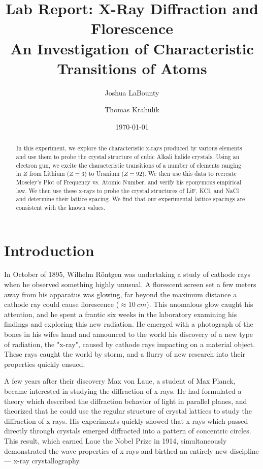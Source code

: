 \documentclass[%
 reprint,
 amsmath,amssymb,
 aps,
 pra,
]{revtex4-1}
\begin{document}

\title{\textbf{Lab Report: X-Ray Diffraction and Florescence} \\ \small{An Investigation of Characteristic Transitions of Atoms}}
\author{Joshua LaBounty}
\author{Thomas Krahulik}

\date{\today}

\begin{abstract}
In this experiment, we explore the characteristic x-rays produced by various elements and use them to probe the crystal structure of cubic Alkali halide crystals. Using an electron gun, we excite the characteristic transitions of a number of elements ranging in $Z$ from Lithium ($Z = 3$) to Uranium ($Z = 92$). We then use this data to recreate Moseley's Plot of Frequency vs. Atomic Number, and verify his eponymous empirical law. We then use these x-rays to probe the crystal structures of LiF, KCl, and NaCl and determine their lattice spacing. We find that our experimental lattice spacings are consistent with the known values.
\end{abstract}
\maketitle

\section{Introduction}

In October of 1895, Wilhelm R\"{o}ntgen was undertaking a study of cathode rays when he observed something highly unusual. A florescent screen set a few meters away from his apparatus was glowing\cite{xray_history}, far beyond the maximum distance a cathode ray could cause florescence ($\approx 10~cm$). This anomalous glow caught his attention, and he spent a frantic six weeks in the laboratory examining his findings and exploring this new radiation. He emerged with a photograph of the bones in his wifes hand and announced to the world his discovery of a new type of radiation, the "x-ray"\cite{rontgen_paper, 50years}, caused by cathode rays impacting on a material object. These rays caught the world by storm, and a flurry of new research into their properties quickly ensued.

A few years after their discovery Max von Laue, a student of Max Planck, became interested in studying the diffraction of x-rays. He had formulated a theory which described the diffraction behavior of light in parallel planes, and theorized that he could use the regular structure of crystal lattices to study the diffraction of x-rays\cite{xray_history}. His experiments quickly showed that x-rays which passed directly through crystals emerged diffracted into a pattern of concentric circles. This result, which earned Laue the Nobel Prize in 1914, simultaneously demonstrated the wave properties of x-rays and birthed an entirely new discipline --- x-ray crystallography\cite{laue}. 
\end{document}
